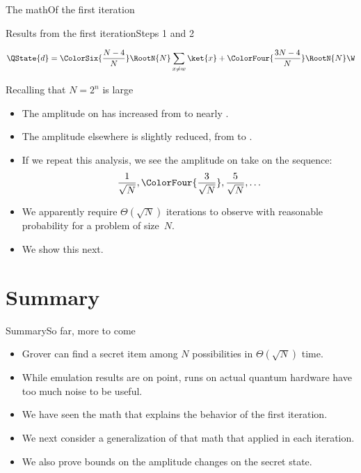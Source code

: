 \begin{Grover}
\begin{frame}{The math}{Of the first iteration}
{ 
}
    
\end{frame}
\begin{frame}{Results from the first iteration}{Steps 1 and 2}

\Vskip{-3em}\[
\QState{d}  = \ColorSix{\frac{N-4}{N}}\RootN{N}\sum_{x\neq w} \ket{x} + \ColorFour{\frac{3N-4}{N}}\RootN{N}\W \]

Recalling that $N=2^{n}$ is large
\begin{itemize}
    \item The amplitude on \W{} has increased from  to nearly .
    \item The amplitude elsewhere is slightly reduced, from  to .
    \item If we repeat this analysis, we see the amplitude on \W{} take on the sequence:
    \[ \frac{1}{\sqrt{N}}, \ColorFour{\frac{3}{\sqrt{N}}}, \frac{5}{\sqrt{N}}, \ldots
    \]
    \item We apparently require $\Theta(\sqrt{N})$ iterations to observe \W{} with reasonable probability for a problem of size~$N$.
    \item We show this next.
\end{itemize}
    
\end{frame}
\end{Grover}
\section*{Summary}
\begin{frame}{Summary}{So far, more to come}
\begin{itemize}
    \item Grover can find a secret item among $N$ possibilities in $\Theta(\sqrt{N})$ time.
    \item While emulation results are on point, runs on actual quantum hardware have too much noise to be useful.
    \item We have seen the math that explains the behavior of the first iteration.
    \item We next consider a generalization of that math that applied in each iteration.
    \item We also prove bounds on the amplitude changes on the secret state.
\end{itemize}
\end{frame}
